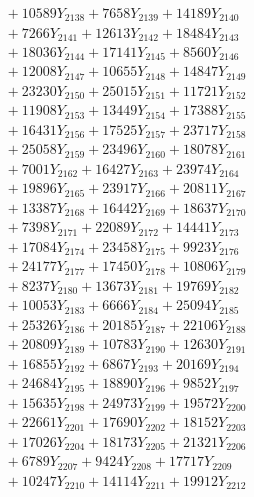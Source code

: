 \documentclass[a4paper,10pt]{article}
\begin{document}
{\begin{align}
&\;  + 10589 Y_{2138} + 7658 Y_{2139} + 14189 Y_{2140} \\[0.3ex]
&\;  + 7266 Y_{2141} + 12613 Y_{2142} + 18484 Y_{2143} \\[0.3ex]
&\;  + 18036 Y_{2144} + 17141 Y_{2145} + 8560 Y_{2146} \\[0.3ex]
&\;  + 12008 Y_{2147} + 10655 Y_{2148} + 14847 Y_{2149} \\[0.3ex]
&\;  + 23230 Y_{2150} + 25015 Y_{2151} + 11721 Y_{2152} \\[0.3ex]
&\;  + 11908 Y_{2153} + 13449 Y_{2154} + 17388 Y_{2155} \\[0.3ex]
&\;  + 16431 Y_{2156} + 17525 Y_{2157} + 23717 Y_{2158} \\[0.5ex]\allowbreak
&\;  + 25058 Y_{2159} + 23496 Y_{2160} + 18078 Y_{2161} \\[0.3ex]
&\;  + 7001 Y_{2162} + 16427 Y_{2163} + 23974 Y_{2164} \\[0.3ex]
&\;  + 19896 Y_{2165} + 23917 Y_{2166} + 20811 Y_{2167} \\[0.3ex]
&\;  + 13387 Y_{2168} + 16442 Y_{2169} + 18637 Y_{2170} \\[0.3ex]
&\;  + 7398 Y_{2171} + 22089 Y_{2172} + 14441 Y_{2173} \\[0.3ex]
&\;  + 17084 Y_{2174} + 23458 Y_{2175} + 9923 Y_{2176} \\[0.3ex]
&\;  + 24177 Y_{2177} + 17450 Y_{2178} + 10806 Y_{2179} \\[0.3ex]
&\;  + 8237 Y_{2180} + 13673 Y_{2181} + 19769 Y_{2182} \\[0.3ex]
&\;  + 10053 Y_{2183} + 6666 Y_{2184} + 25094 Y_{2185} \\[0.3ex]
&\;  + 25326 Y_{2186} + 20185 Y_{2187} + 22106 Y_{2188} \\[0.5ex]\allowbreak
&\;  + 20809 Y_{2189} + 10783 Y_{2190} + 12630 Y_{2191} \\[0.3ex]
&\;  + 16855 Y_{2192} + 6867 Y_{2193} + 20169 Y_{2194} \\[0.3ex]
&\;  + 24684 Y_{2195} + 18890 Y_{2196} + 9852 Y_{2197} \\[0.3ex]
&\;  + 15635 Y_{2198} + 24973 Y_{2199} + 19572 Y_{2200} \\[0.3ex]
&\;  + 22661 Y_{2201} + 17690 Y_{2202} + 18152 Y_{2203} \\[0.3ex]
&\;  + 17026 Y_{2204} + 18173 Y_{2205} + 21321 Y_{2206} \\[0.3ex]
&\;  + 6789 Y_{2207} + 9424 Y_{2208} + 17717 Y_{2209} \\[0.3ex]
&\;  + 10247 Y_{2210} + 14114 Y_{2211} + 19912 Y_{2212} \\[0.3ex]

\end{align}}
\end{document}
